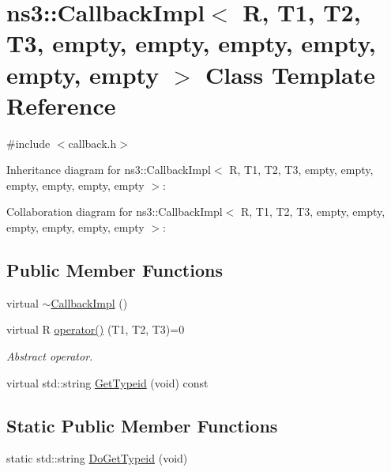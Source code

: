 \hypertarget{classns3_1_1CallbackImpl_3_01R_00_01T1_00_01T2_00_01T3_00_01empty_00_01empty_00_01empty_00_01empty_00_01empty_00_01empty_01_4}{}\section{ns3\+:\+:Callback\+Impl$<$ R, T1, T2, T3, empty, empty, empty, empty, empty, empty $>$ Class Template Reference}
\label{classns3_1_1CallbackImpl_3_01R_00_01T1_00_01T2_00_01T3_00_01empty_00_01empty_00_01empty_00_01empty_00_01empty_00_01empty_01_4}


{\ttfamily \#include $<$callback.\+h$>$}



Inheritance diagram for ns3\+:\+:Callback\+Impl$<$ R, T1, T2, T3, empty, empty, empty, empty, empty, empty $>$\+:


Collaboration diagram for ns3\+:\+:Callback\+Impl$<$ R, T1, T2, T3, empty, empty, empty, empty, empty, empty $>$\+:
\subsection*{Public Member Functions}
\begin{DoxyCompactItemize}
\item 
virtual \hyperlink{classns3_1_1CallbackImpl_3_01R_00_01T1_00_01T2_00_01T3_00_01empty_00_01empty_00_01empty_00_01empty_00_01empty_00_01empty_01_4_a0af9c1f5e93e1f59f5fc8c19f794ca84}{$\sim$\+Callback\+Impl} ()
\item 
virtual R \hyperlink{classns3_1_1CallbackImpl_3_01R_00_01T1_00_01T2_00_01T3_00_01empty_00_01empty_00_01empty_00_01empty_00_01empty_00_01empty_01_4_a77ae7887e11c46188b078cd15f517535}{operator()} (T1, T2, T3)=0
\begin{DoxyCompactList}\small\item\em Abstract operator. \end{DoxyCompactList}\item 
virtual std\+::string \hyperlink{classns3_1_1CallbackImpl_3_01R_00_01T1_00_01T2_00_01T3_00_01empty_00_01empty_00_01empty_00_01empty_00_01empty_00_01empty_01_4_a3db5e0f8030b5e86422aed8eb7bc5e09}{Get\+Typeid} (void) const 
\end{DoxyCompactItemize}
\subsection*{Static Public Member Functions}
\begin{DoxyCompactItemize}
\item 
static std\+::string \hyperlink{classns3_1_1CallbackImpl_3_01R_00_01T1_00_01T2_00_01T3_00_01empty_00_01empty_00_01empty_00_01empty_00_01empty_00_01empty_01_4_ace9b5582c5a18cfd5a4dbd9144ff9ada}{Do\+Get\+Typeid} (void)
\end{DoxyCompactItemize}
